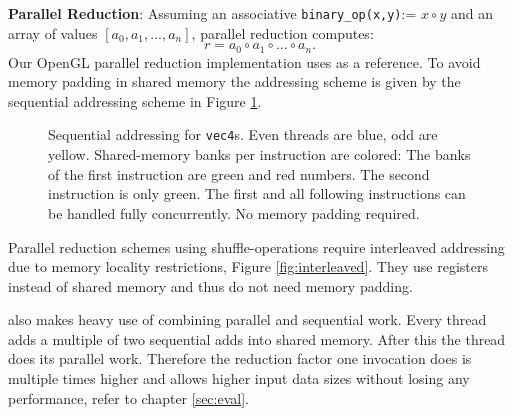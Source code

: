 \documentclass[m,times]{cgMA}
\begin{document}
\textbf{Parallel Reduction}: Assuming an associative \texttt{binary\_op(x,y)}:= $x \circ y$ and an array of values $\left[a_0,a_1, ... ,a_n\right]$, parallel reduction computes:
\begin{equation}
  r = a_0 \circ a_1 \circ ... \circ a_n.
\end{equation}
Our OpenGL parallel reduction implementation uses \cite{NVIDIA:PARALLEL_REDUCTION} as a reference. To avoid memory padding in shared memory the addressing scheme is given by the sequential addressing scheme in Figure \ref{fig:sequential}.
\begin{figure}[htbp]
    \centering
  
  \caption{Sequential addressing for \texttt{vec4}s. Even threads are blue, odd are yellow. Shared-memory banks per instruction are colored: The banks of the first instruction are green and red numbers. The second instruction is only green. The first and all following instructions can be handled fully concurrently. No memory padding required.}
\label{fig:sequential}
\end{figure}

Parallel reduction schemes using shuffle-operations require interleaved addressing due to memory locality restrictions, Figure \ref{fig:interleaved}. They use registers instead of shared memory and thus do not need memory padding. \cite{NVIDIA:SHUFFLE}

\cite{NVIDIA:PARALLEL_REDUCTION} also makes heavy use of combining parallel and sequential work. Every thread adds a multiple of two sequential adds into shared memory. After this the thread does its parallel work. Therefore the reduction factor one invocation does is multiple times higher and allows higher input data sizes without losing any performance, refer to chapter \ref{sec:eval}.
\end{document}
